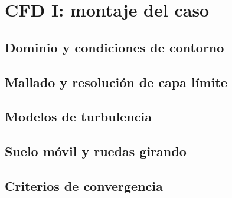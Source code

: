 \chapter{CFD I: montaje del caso}
\label{ch:cfd_montaje_caso}

\begin{objetivos}
  \item {}
  \item {}
  \item {}
\end{objetivos}


\section{Dominio y condiciones de contorno}
\label{sec:cfd_montaje_caso:01}

\section{Mallado y resolución de capa límite}
\label{sec:cfd_montaje_caso:02}

\section{Modelos de turbulencia}
\label{sec:cfd_montaje_caso:03}

\section{Suelo móvil y ruedas girando}
\label{sec:cfd_montaje_caso:04}

\section{Criterios de convergencia}
\label{sec:cfd_montaje_caso:05}


